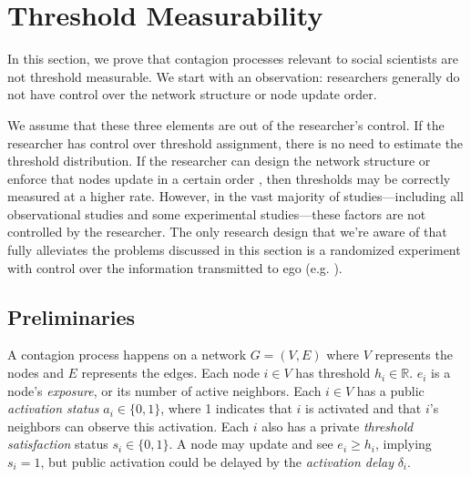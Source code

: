 \documentclass[a4paper]{article}
\begin{document}
\section{Threshold Measurability}

In this section, we prove that contagion processes relevant to social scientists are not threshold measurable. We start with an observation: researchers generally do not have control over the network structure or node update order.

We assume that these three elements are out of the researcher's control. If the researcher has control over threshold assignment, there is no need to estimate the threshold distribution. If the researcher can design the network structure \parencite{centola} or enforce that nodes update in a certain order \parencite{tsvetkova}, then thresholds may be correctly measured at a higher rate. However, in the vast majority of studies---including all observational studies and some experimental studies---these factors are not controlled by the researcher. The only research design that we're aware of that fully alleviates the problems discussed in this section is a randomized experiment with control over the information transmitted to ego (e.g. \cite{bakshy}).

\subsection{Preliminaries}

\begin{comment}
I don't want to do it, but we need to use a knowledge operator here to clearly express our ideas.

There is a distinction between an agent (node) knowing its own status, vs a researcher knowing the node's status


\end{comment}

A contagion process happens on a network $G = (V, E)$ where $V$ represents the nodes and $E$ represents the edges. Each node $i \in V$ has threshold $h_i \in \mathbb{R}$. $e_i$ is a node's \emph{exposure}, or its number of active neighbors. Each $i \in V$ has a public \emph{activation status} $a_i \in \{0, 1\}$, where 1 indicates that $i$ is activated and that $i$'s neighbors can observe this activation. Each $i$ also has a private \emph{threshold satisfaction} status $s_i \in \{0, 1\}$. A node may update and see $e_i \ge h_i$, implying $s_i = 1$, but public activation could be delayed by the \emph{activation delay} $\delta_i$.
\end{document}

